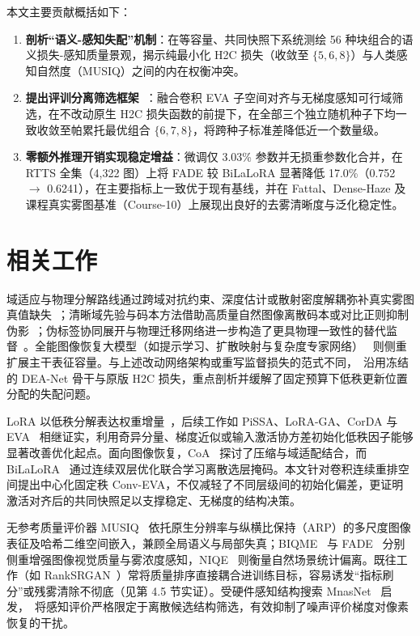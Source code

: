 \documentclass[10pt,twocolumn,letterpaper]{article}
\begin{document}
本文主要贡献概括如下：
\begin{enumerate}\setlength{\itemsep}{1pt}\setlength{\parskip}{0pt}
\item \textbf{剖析“语义-感知失配”机制}：在等容量、共同快照下系统测绘 56 种块组合的语义损失-感知质量景观，揭示纯最小化 H2C 损失（收敛至 $\{5,6,8\}$）与人类感知自然度（MUSIQ）之间的内在权衡冲突。
\item \textbf{提出评训分离筛选框架~\method}：融合卷积 EVA 子空间对齐与无梯度感知可行域筛选，在不改动原生 H2C 损失函数的前提下，在全部三个独立随机种子下均一致收敛至帕累托最优组合 $\{6,7,8\}$，将跨种子标准差降低近一个数量级。
\item \textbf{零额外推理开销实现稳定增益}：微调仅 3.03\% 参数并无损重参数化合并，在 RTTS 全集（4,322 图）上将 FADE 较 BiLaLoRA 显著降低 17.0\%（0.752 $\to$ 0.6241），在主要指标上一致优于现有基线，并在 Fattal、Dense-Haze 及课程真实雾图基准（Course-10）上展现出良好的去雾清晰度与泛化稳定性。
\end{enumerate}

\section{相关工作}
域适应与物理分解路线通过跨域对抗约束、深度估计或散射密度解耦弥补真实雾图真值缺失~\cite{dad2020,psd2021,d42022,kanet2024}；清晰域先验与码本方法借助高质量自然图像离散码本或对比正则抑制伪影~\cite{ridcp2023,odcr2024,ipc2025}；伪标签协同展开与物理迁移网络进一步构造了更具物理一致性的替代监督~\cite{corun2024,phatnet2025}。全能图像恢复大模型（如提示学习、扩散映射与复杂度专家网络）~\cite{promptir2023,diffuir2024,moce2025,foundir2025} 则侧重扩展主干表征容量。与上述改动网络架构或重写监督损失的范式不同，\method~沿用冻结的 DEA-Net 骨干与原版 H2C 损失，重点剖析并缓解了固定预算下低秩更新位置分配的失配问题。

LoRA 以低秩分解表达权重增量~\cite{lora2022}，后续工作如 PiSSA、LoRA-GA、CorDA 与 EVA~\cite{pissa2024,loraga2024,corda2024,eva2025} 相继证实，利用奇异分量、梯度近似或输入激活协方差初始化低秩因子能够显著改善优化起点。面向图像恢复，CoA~\cite{coa2025} 探讨了压缩与域适配结合，而 BiLaLoRA~\cite{bilalora2026} 通过连续双层优化联合学习离散选层掩码。本文针对卷积连续重排空间提出中心化固定秩 Conv-EVA，不仅减轻了不同层级间的初始化偏差，更证明激活对齐后的共同快照足以支撑稳定、无梯度的结构决策。

无参考质量评价器 MUSIQ~\cite{musiq2021} 依托原生分辨率与纵横比保持（ARP）的多尺度图像表征及哈希二维空间嵌入，兼顾全局语义与局部失真；BIQME~\cite{biqme2018} 与 FADE~\cite{fade2015} 分别侧重增强图像视觉质量与雾浓度感知，NIQE~\cite{niqe2013} 则衡量自然场景统计偏离。既往工作（如 RankSRGAN~\cite{ranksrgan2019}）常将质量排序直接耦合进训练目标，容易诱发“指标刷分”或残雾清除不彻底（见第 4.5 节实证）。受硬件感知结构搜索 MnasNet~\cite{mnasnet2019} 启发，\method~将感知评价严格限定于离散候选结构筛选，有效抑制了噪声评价梯度对像素恢复的干扰。
\end{document}
